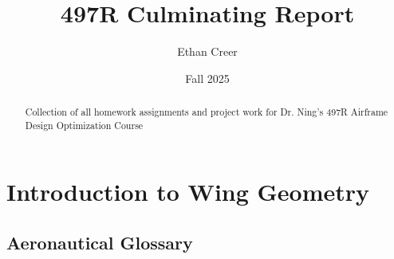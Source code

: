 \documentclass{report}
\title{497R Culminating Report}
\author{Ethan Creer}
\date{Fall 2025}
\begin{document}
\maketitle


\begin{abstract}
    Collection of all homework assignments and project work for Dr. Ning's 497R Airframe Design Optimization Course 
\end{abstract}

\tableofcontents

\chapter{Introduction to Wing Geometry}
\section{Aeronautical Glossary}
\end{document}
